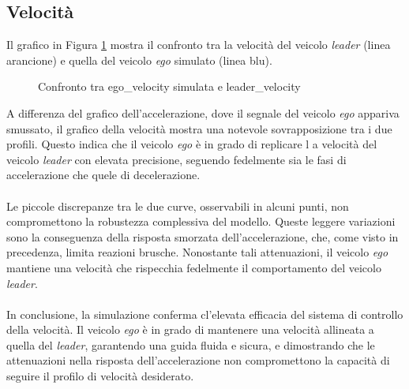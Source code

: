 \subsection{Velocità}
Il grafico in Figura \ref{fig:vel_leader_ego} mostra il confronto tra la velocità del veicolo \emph{leader} 
(linea arancione) e quella del veicolo \emph{ego} simulato (linea blu).
\begin{figure}[H]
    \centering
    \caption{Confronto tra ego\_velocity simulata e leader\_velocity}
    \label{fig:vel_leader_ego}
\end{figure}
\noindent A differenza del grafico dell'accelerazione, dove il segnale del veicolo \emph{ego} appariva smussato, il grafico della 
velocità mostra una notevole sovrapposizione tra i due profili. Questo indica che il veicolo \emph{ego} è in grado di replicare l
a velocità del veicolo \emph{leader} con elevata precisione, seguendo fedelmente sia le fasi di accelerazione che quele di decelerazione.
\\\\
\noindent Le piccole discrepanze tra le due curve, osservabili in alcuni punti, non compromettono la robustezza complessiva del modello. 
Queste leggere variazioni sono la conseguenza della risposta smorzata dell'accelerazione, che, come visto in precedenza, 
limita reazioni brusche. Nonostante tali attenuazioni, il veicolo \emph{ego} mantiene una velocità che rispecchia fedelmente 
il comportamento del veicolo \emph{leader}.
\\\\
\noindent In conclusione, la simulazione conferma cl’elevata efficacia del sistema di controllo della velocità. Il veicolo \emph{ego}
è in grado di mantenere una velocità allineata a quella del \emph{leader}, garantendo una guida fluida e sicura, 
e dimostrando che le attenuazioni nella risposta dell'accelerazione non compromettono la capacità di seguire il profilo di velocità 
desiderato.